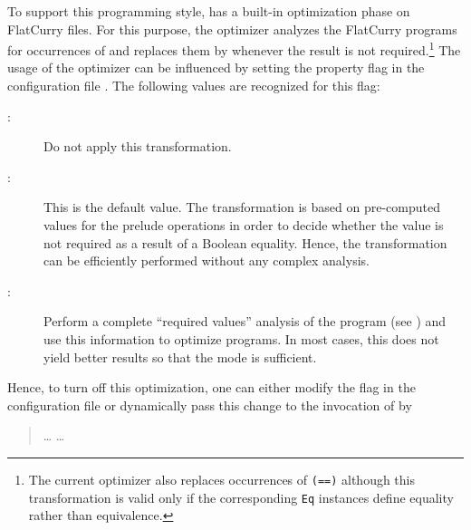 To support this programming style, \CYS has a built-in optimization phase
on FlatCurry files. For this purpose, the optimizer analyzes
the FlatCurry programs for occurrences of \ccode{===}
and replaces them by \ccode{=:=} whenever the result 
is not required.\footnote{The current optimizer
also replaces occurrences of \texttt{(==)} although this
transformation is valid only if the corresponding \texttt{Eq} instances
define equality rather than equivalence.}
The usage of the optimizer can be influenced by setting
the property flag  in the
configuration file \code{\curryrc}.
The following values are recognized for this flag:
\begin{description}
\item[:] Do not apply this transformation.
\item[:] This is the default value.
The transformation is based on pre-computed values for
the prelude operations in order to decide whether the
value  is not required as a result of a Boolean equality.
Hence, the transformation can be efficiently performed
without any complex analysis.
\item[:] Perform a complete ``required values'' analysis
of the program (see \cite{AntoyHanus15LOPSTR})
and use this information to optimize programs.
In most cases, this does not yield better results so that
the  mode is sufficient.
\end{description}
%
Hence, to turn off this optimization, one can either modify
the flag  in the
configuration file \code{\curryrc} or dynamically pass this change
to the invocation of \CYS by
\begin{quote}
\ldots{}  \ldots
\end{quote}
